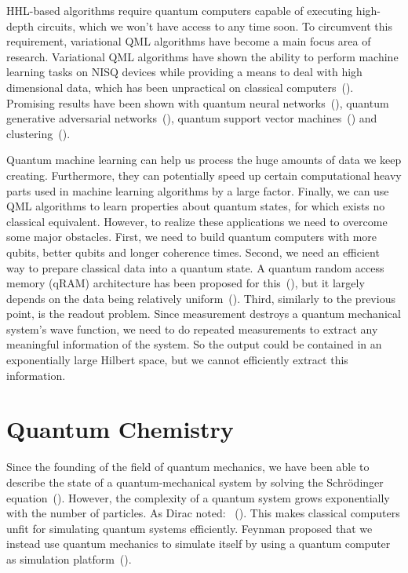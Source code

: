 \documentclass[a4paper,10pt]{article}
\begin{document}
HHL-based algorithms require quantum computers capable of executing high-depth circuits, which we won't have access to any time soon.
To circumvent this requirement, variational QML algorithms have become a main focus area of research.
Variational QML algorithms have shown the ability to perform machine learning tasks on NISQ devices while providing a means to deal with high dimensional data, which has been unpractical on classical computers~(\cite{mitarai2018quantum}).
Promising results have been shown with quantum neural networks~(\cite{qnn-near-term, schuld2018circuit, fanizza2019optimal}), quantum generative adversarial networks~(\cite{romero2019variational, benedetti2019adversarial}), quantum support vector machines~(\cite{havlivcek2019supervised, schuld2019quantum}) and clustering~(\cite{otterbach2017unsupervised}).

Quantum machine learning can help us process the huge amounts of data we keep creating.
Furthermore, they can potentially speed up certain computational heavy parts used in machine learning algorithms by a large factor.
Finally, we can use QML algorithms to learn properties about quantum states, for which exists no classical equivalent.
However, to realize these applications we need to overcome some major obstacles.
First, we need to build quantum computers with more qubits, better qubits and longer coherence times.
Second, we need an efficient way to prepare classical data into a quantum state.
A quantum random access memory (qRAM) architecture has been proposed for this~(\cite{qram}), but it largely depends on the data being relatively uniform~(\cite{aaronson2015read}).
Third, similarly to the previous point, is the readout problem.
Since measurement destroys a quantum mechanical system's wave function, we need to do repeated measurements to extract any meaningful information of the system.
So the output could be contained in an exponentially large Hilbert space, but we cannot efficiently extract this information.

\section{Quantum Chemistry} \label{sec:quantum-chemistry}
Since the founding of the field of quantum mechanics, we have been able to describe the state of a quantum-mechanical system by solving the Schr{\"o}dinger equation~(\cite{griffiths2018introduction}).
However, the complexity of a quantum system grows exponentially with the number of particles.
As Dirac noted: ~(\cite{dirac1929quantum}).
This makes classical computers unfit for simulating quantum systems efficiently.
Feynman proposed that we instead use quantum mechanics to simulate itself by using a quantum computer as simulation platform~(\cite{feynman-simulating}).
\end{document}
